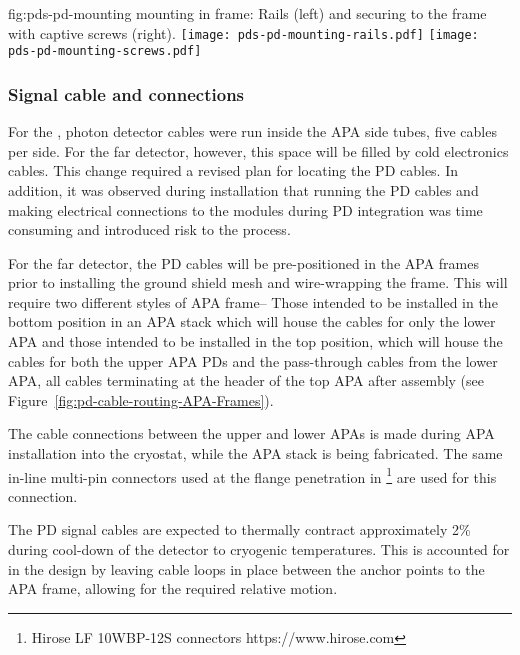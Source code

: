 
\begin{dunefigure}{fig:pds-pd-mounting}
{ mounting in  frame: Rails (left) and securing to the frame with captive screws  (right).}
	\texttt{[image: pds-pd-mounting-rails.pdf]}
	\texttt{[image: pds-pd-mounting-screws.pdf]}
\end{dunefigure}

\subsubsection{Signal cable and connections}

For the  , photon detector cables were run inside the APA side tubes, five cables per side.  For the far detector, however, this space will be filled by cold electronics cables.  This change required a revised plan for locating the PD cables.  In addition, it was observed during   installation that running the PD cables and making electrical connections to the modules during PD integration was time consuming and introduced risk to the process.

For the far detector, the PD cables will be pre-positioned in the APA frames prior to installing the ground shield mesh and wire-wrapping the frame.  This will require two different styles of APA frame--  Those intended to be installed in the bottom position in an APA stack which will house the cables for only the lower APA and those intended to be installed in the top position, which will house the cables for both the upper APA PDs and the pass-through cables from the lower APA, all cables terminating at the header of the top APA after assembly (see Figure~\ref{fig:pd-cable-routing-APA-Frames}).

The cable connections between the upper and lower APAs is made during APA installation into the cryostat, while the APA stack is being fabricated.  The same in-line multi-pin connectors used at the flange penetration in \footnote{Hirose LF 10WBP-12S connectors https://www.hirose.com} are used for this connection.

The PD signal cables are expected to thermally contract approximately 2\% during cool-down of the detector to cryogenic temperatures.  This is accounted for in the design by leaving cable loops in place between the anchor points to the APA frame, allowing for the required relative motion.

